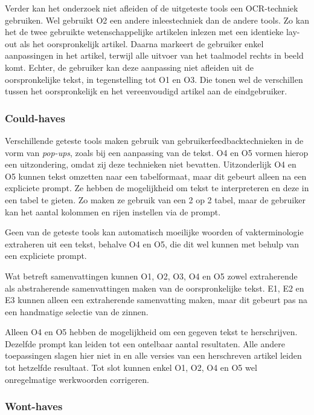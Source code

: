 Verder kan het onderzoek niet afleiden of de uitgeteste tools een OCR-techniek gebruiken. Wel gebruikt O2 een andere inleestechniek dan de andere tools. Zo kan het de twee gebruikte wetenschappelijke artikelen inlezen met een identieke lay-out als het oorspronkelijk artikel. Daarna markeert de gebruiker enkel aanpassingen in het artikel, terwijl alle uitvoer van het taalmodel rechts in beeld komt. Echter, de gebruiker kan deze aanpassing niet afleiden uit de oorspronkelijke tekst, in tegenstelling tot O1 en O3. Die tonen wel de verschillen tussen het oorspronkelijk en het vereenvoudigd artikel aan de eindgebruiker.

\subsubsection{Could-haves}

Verschillende geteste tools maken gebruik van gebruikerfeedbacktechnieken in de vorm van \textit{pop-ups}, zoals bij een aanpassing van de tekst. O4 en O5 vormen hierop een uitzondering, omdat zij deze technieken niet bevatten. Uitzonderlijk O4 en O5 kunnen tekst omzetten naar een tabelformaat, maar dit gebeurt alleen na een expliciete prompt. Ze hebben de mogelijkheid om tekst te interpreteren en deze in een tabel te gieten. Zo maken ze gebruik van een 2 op 2 tabel, maar de gebruiker kan het aantal kolommen en rijen instellen via de prompt.

\medspace

Geen van de geteste tools kan automatisch moeilijke woorden of vakterminologie extraheren uit een tekst, behalve O4 en O5, die dit wel kunnen met behulp van een expliciete prompt.

\medspace

Wat betreft samenvattingen kunnen O1, O2, O3, O4 en O5 zowel extraherende als abstraherende samenvattingen maken van de oorspronkelijke tekst. E1, E2 en E3 kunnen alleen een extraherende samenvatting maken, maar dit gebeurt pas na een handmatige selectie van de zinnen.

\medspace

Alleen O4 en O5 hebben de mogelijkheid om een gegeven tekst te herschrijven. Dezelfde prompt kan leiden tot een ontelbaar aantal resultaten. Alle andere toepassingen slagen hier niet in en alle versies van een herschreven artikel leiden tot hetzelfde resultaat. Tot slot kunnen enkel O1, O2, O4 en O5 wel onregelmatige werkwoorden corrigeren.

\subsubsection{Wont-haves}

